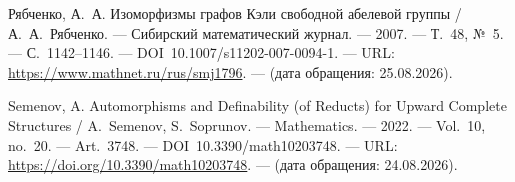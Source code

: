 \documentclass[12pt,a4paper]{article}
\theoremstyle{namedStatement}
\theoremstyle{plain}
\theoremstyle{definition}
\newif\ifshowtemporarytext
\newcommand{\temporarytext}[1]{%
  \ifshowtemporarytext
    {\color{todocolor}\bfseries #1}%
  \fi
}
\begin{document}
\begin{thebibliography}{9}
Рябченко, А.~А. Изоморфизмы графов Кэли свободной абелевой группы /
А.~А.~Рябченко. ---
Сибирский математический журнал. --- 2007. ---
Т.~48, №~5. --- С.~1142--1146. ---
DOI~10.1007/s11202-007-0094-1. ---
URL: \url{https://www.mathnet.ru/rus/smj1796}. ---
(дата обращения: 25.08.2026).

\temporarytext{Barbina, S. Model Theory : lecture notes / S.~Barbina ; notes by
L.~Tomczak. --- Cambridge Part III, Lent 2023. --- Текст : электронный. ---
URL: \url{https://math.berkeley.edu/~ltomczak/notes/Lent2023/ModelTheory_Notes.pdf}. ---
A conspect on model theory. ---
(дата обращения: 24.08.2026).}

Semenov, A. Automorphisms and Definability (of Reducts) for Upward Complete
Structures / A.~Semenov, S.~Soprunov. ---
Mathematics. --- 2022. ---
Vol.~10, no.~20. --- Art.~3748. ---
DOI~10.3390/math10203748. ---
URL: \url{https://doi.org/10.3390/math10203748}. ---
(дата обращения: 24.08.2026).

\end{thebibliography}
\endgroup
\end{document}
